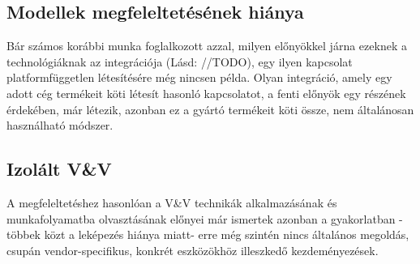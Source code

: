     \subsection{Modellek megfeleltetésének hiánya}
    Bár számos korábbi munka foglalkozott azzal, milyen előnyökkel járna ezeknek a technológiáknak az integrációja (Lásd: //TODO), egy ilyen kapcsolat platformfüggetlen létesítésére még nincsen példa.
    Olyan integráció, amely egy adott cég termékeit köti létesít hasonló kapcsolatot, a fenti előnyök egy részének érdekében, már létezik, azonban ez a gyártó termékeit köti össze, nem általánosan használható módszer.

    \subsection{Izolált V\&V}
    A megfeleltetéshez hasonlóan a V\&V technikák alkalmazásának és munkafolyamatba olvasztásának előnyei már ismertek azonban a gyakorlatban -többek közt a leképezés hiánya miatt- erre még szintén nincs általános megoldás, csupán vendor-specifikus, konkrét eszközökhöz illeszkedő kezdeményezések.
